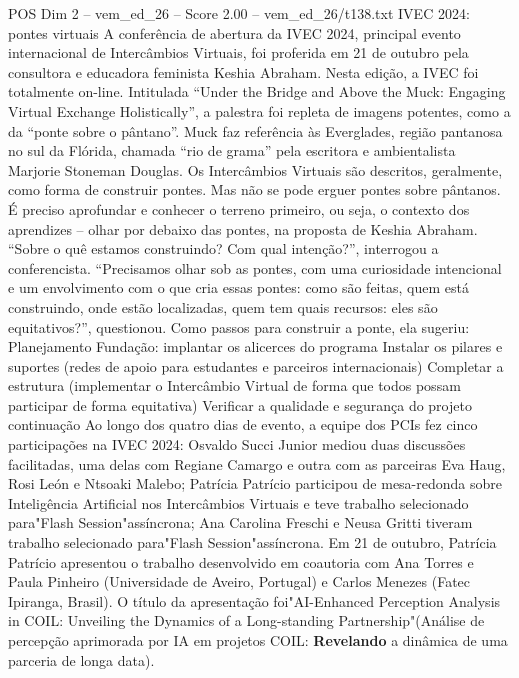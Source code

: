 \begin{textsample}{POS Dim 2 – vem\_ed\_26 – Score 2.00 – vem\_ed\_26/t138.txt}  \label{ex:f2_pos_033}
IVEC 2024: pontes virtuais A conferência de abertura da IVEC 2024, principal evento internacional de Intercâmbios Virtuais, foi proferida em 21 de outubro pela consultora e educadora feminista Keshia Abraham.
Nesta edição, a IVEC foi totalmente on-line.
Intitulada “Under the Bridge and Above the Muck: Engaging Virtual Exchange Holistically”, a palestra foi repleta de imagens potentes, como a da “ponte sobre o pântano”.
Muck faz referência às Everglades, região pantanosa no sul da Flórida, chamada “rio de grama” pela escritora e ambientalista Marjorie Stoneman Douglas.
Os Intercâmbios Virtuais são descritos, geralmente, como forma de construir pontes.
Mas não se pode erguer pontes sobre pântanos.
É preciso aprofundar e conhecer o terreno primeiro, ou seja, o contexto dos aprendizes – olhar por debaixo das pontes, na proposta de Keshia Abraham. “Sobre o quê estamos construindo?
Com qual intenção?”, interrogou a conferencista. “Precisamos olhar sob as pontes, com uma curiosidade intencional e um envolvimento com o que cria essas pontes: como são feitas, quem está construindo, onde estão localizadas, quem tem quais recursos: eles são equitativos?”, questionou.
Como passos para construir a ponte, ela sugeriu: Planejamento Fundação: implantar os alicerces do programa Instalar os pilares e suportes (redes de apoio para estudantes e parceiros internacionais) Completar a estrutura (implementar o Intercâmbio Virtual de forma que todos possam participar de forma equitativa) Verificar a qualidade e segurança do projeto continuação Ao longo dos quatro dias de evento, a equipe dos PCIs fez cinco participações na IVEC 2024: Osvaldo Succi Junior mediou duas discussões facilitadas, uma delas com Regiane Camargo e outra com as parceiras Eva Haug, Rosi León e Ntsoaki Malebo; Patrícia Patrício participou de mesa-redonda sobre Inteligência Artificial nos Intercâmbios Virtuais e teve trabalho selecionado para"Flash Session"assíncrona; Ana Carolina Freschi e Neusa Gritti tiveram trabalho selecionado para"Flash Session"assíncrona.
Em 21 de outubro, Patrícia Patrício apresentou o trabalho desenvolvido em coautoria com Ana Torres e Paula Pinheiro (Universidade de Aveiro, Portugal) e Carlos Menezes (Fatec Ipiranga, Brasil).
O título da apresentação foi"AI-Enhanced Perception Analysis in COIL: Unveiling the Dynamics of a Long-standing Partnership"(Análise de percepção aprimorada por IA em projetos COIL: \textbf{Revelando} a dinâmica de uma parceria de longa data).

\end{textsample}
